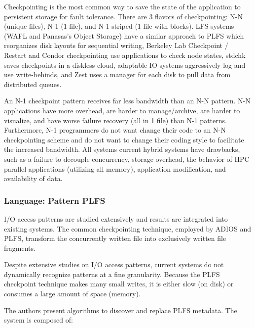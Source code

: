 Checkpointing is the most common way to save the state of the application to
persistent storage for fault tolerance. There are 3 flavors of checkpointing:
N-N (unique files), N-1 (1 file), and N-1 striped (1 file with blocks). LFS
systems (WAFL and Panasas's Object Storage) have a similar approach to PLFS
which reorganizes disk layouts for sequential writing, Berkeley Lab Checkpoint
/ Restart and Condor checkpointing use applications to check node states,
stdchk saves checkpoints in a  diskless cloud, adaptable IO systems
aggressively log and use write-behinds, and Zest uses a manager for each disk
to pull data from distributed queues.

An N-1 checkpoint pattern receives far less bandwidth than an N-N pattern. N-N
applications have more overhead, are harder to manage/archive, are harder to
visualize, and have worse failure recovery (all in 1 file) than N-1 patterns.
Furthermore, N-1 programmers do not want change their code to an N-N
checkpointing scheme and do not want to change their coding style to facilitate
the increased bandwidth. All systems current hybrid systems have drawbacks,
such as a failure to decouple concurrency, storage overhead, the behavior of
HPC parallel applications (utilizing all memory), application modification, and
availability of data.

\subsubsection{Language: Pattern PLFS}
\label{sec:language-patterned-io}

I/O access patterns are studied extensively and results are integrated into
existing systems. The common checkpointing technique, employed by ADIOS and
PLFS, transform the concurrently written file into exclusively written file
fragments. 

Despite extensive studies on I/O access patterns, current systems do not
dynamically recognize patterns at a fine granularity. Because the PLFS
checkpoint technique makes many small writes, it is either slow (on disk) or
consumes a large amount of space (memory).  

The authors present algorithms to discover and replace PLFS metadata. The
system is composed of: 

